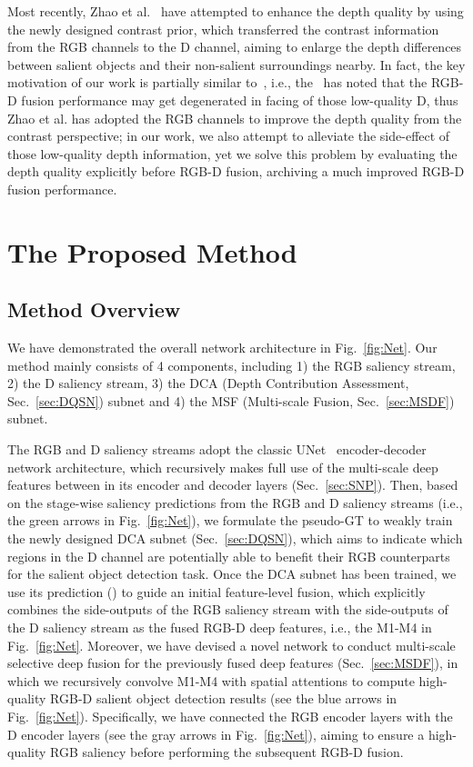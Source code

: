 \documentclass[journal]{IEEEtran}
\begin{document}
Most recently, Zhao et al.~\cite{zhao2019contrast} have attempted to enhance the depth quality by using the newly designed contrast prior, which transferred the contrast information from the RGB channels to the D channel, aiming to enlarge the depth differences between salient objects and their non-salient surroundings nearby.
In fact, the key motivation of our work is partially similar to~\cite{zhao2019contrast}, i.e., the~\cite{zhao2019contrast} has noted that the RGB-D fusion performance may get degenerated in facing of those low-quality D, thus Zhao et al. has adopted the RGB channels to improve the depth quality from the contrast perspective; in our work, we also attempt to alleviate the side-effect of those low-quality depth information, yet we solve this problem by evaluating the depth quality explicitly before RGB-D fusion, archiving a much improved RGB-D fusion performance.

\section{The Proposed Method}
\subsection{Method Overview}
We have demonstrated the overall network architecture in Fig.~\ref{fig:Net}.
Our method mainly consists of 4 components, including 1) the RGB saliency stream, 2) the D saliency stream, 3) the DCA (Depth Contribution Assessment, Sec.~\ref{sec:DQSN}) subnet and 4) the MSF (Multi-scale Fusion, Sec.~\ref{sec:MSDF}) subnet.

The RGB and D saliency streams adopt the classic UNet~\cite{ronneberger2015u} encoder-decoder network architecture, which recursively makes full use of the multi-scale deep features between in its encoder and decoder layers (Sec.~\ref{sec:SNP}).
Then, based on the stage-wise saliency predictions from the RGB and D saliency streams (i.e., the green arrows in Fig.~\ref{fig:Net}), we formulate the pseudo-GT to weakly train the newly designed DCA subnet (Sec.~\ref{sec:DQSN}), which aims to indicate which regions in the D channel are potentially able to benefit their RGB counterparts for the salient object detection task.
Once the DCA subnet has been trained, we use its prediction () to guide an initial feature-level fusion, which explicitly combines the side-outputs of the RGB saliency stream with the side-outputs of the D saliency stream as the fused RGB-D deep features, i.e., the M1-M4 in Fig.~\ref{fig:Net}.
Moreover, we have devised a novel network to conduct multi-scale selective deep fusion for the previously fused deep features (Sec.~\ref{sec:MSDF}), in which we recursively convolve M1-M4 with spatial attentions to compute high-quality RGB-D salient object detection results (see the blue arrows in Fig.~\ref{fig:Net}).
Specifically, we have connected the RGB encoder layers with the D encoder layers (see the gray arrows in Fig.~\ref{fig:Net}), aiming to ensure a high-quality RGB saliency before performing the subsequent RGB-D fusion.
\end{document}
